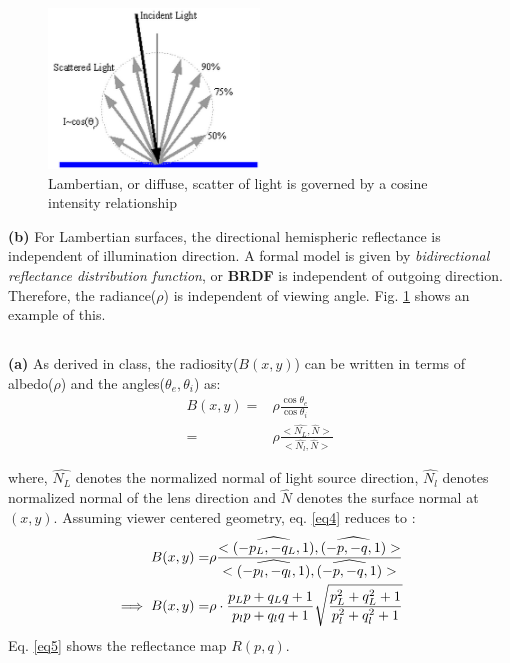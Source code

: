 \documentclass[11pt]{article}
\begin{document}
\begin{figure}[!hbt]
\centering
\includegraphics[width=0.5\textwidth]{pic3.png}
\vspace{-10pt}
\caption{Lambertian, or diffuse, scatter of light is governed by a cosine intensity relationship}
\label{fig2}
\end{figure}

\par \textbf{(b)}  For Lambertian surfaces, the directional hemispheric reflectance is independent of illumination direction. A formal model is given by \emph{bidirectional reflectance distribution function}, or \textbf{BRDF} is independent of outgoing direction. Therefore, the radiance($\rho$) is independent of viewing angle. Fig. \ref{fig2} shows an example of this. 

\subsection{}
\textbf{(a)} As derived in class, the radiosity($B(x,y)$) can be written in terms of albedo($\rho$) and the angles($\theta_e, \theta_i$) as:
\vspace{-10pt}
\begin{align}
  B(x,y) =&  \rho \frac{\cos \theta_e}{\cos \theta_i} \\
       =&  \rho \frac{<\widehat{N_L}, \widehat{N}>}{<\widehat{N_l}, \hat{N} >}
 \label{eq4}
\end{align}

where, $\widehat{N_L}$ denotes the normalized normal of light source direction, $\widehat{N_l}$ denotes normalized normal of the lens direction and $\widehat{N}$ denotes the surface normal at $(x,y)$. Assuming viewer centered geometry, eq. \ref{eq4} reduces to :
\vspace{-10pt}
\begin{align}
B(x,y)  =& \rho \frac{ < \widehat{(-p_L, -q_L, 1)}, \widehat{(-p,-q,1)}> }{ < \widehat{(-p_l,-q_l,1)}, \widehat{(-p,-q,1)} > } \notag \\
\implies B(x,y) =& \rho \cdot \frac{p_L p+q_L q + 1}{ p_l p + q_l q + 1} \sqrt{ \frac{p_L^2 + q_L^2 + 1}{p_l^2 + q_l^2 + 1} } 
\label{eq5}
\end{align}
\vspace{-10pt}
Eq. \ref{eq5} shows the reflectance map $R(p,q)$.
\end{document}
